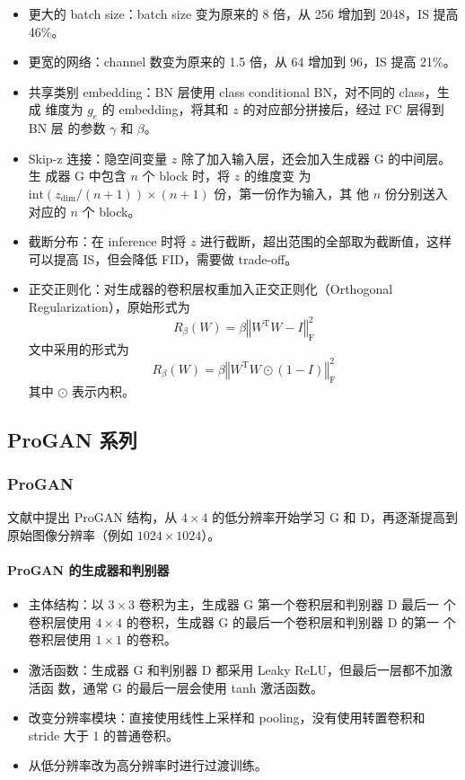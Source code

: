 \begin{itemize}
  \item 更大的 batch size：batch size 变为原来的 8 倍，从 256 增加到 2048，IS 提高 46\%。
  \item 更宽的网络：channel 数变为原来的 1.5 倍，从 64 增加到 96，IS 提高 21\%。
  \item 共享类别 embedding：BN 层使用 class conditional BN，对不同的 class，生成
    维度为 $g_e$ 的 embedding，将其和 $z$ 的对应部分拼接后，经过 FC 层得到 BN 层
    的参数 $\gamma$ 和 $\beta$。
  \item Skip-z 连接：隐空间变量 $z$ 除了加入输入层，还会加入生成器 G 的中间层。生
    成器 G 中包含 $n$ 个 block 时，将 $z$ 的维度变
    为 $\mathrm{int}({z}_{\mathrm{dim}} / (n+1)) \times (n+1)$ 份，第一份作为输入，其
    他 $n$ 份分别送入对应的 $n$ 个 block。
  \item 截断分布：在 inference 时将 $z$ 进行截断，超出范围的全部取为截断值，这样
    可以提高 IS，但会降低 FID，需要做 trade-off。
  \item 正交正则化：对生成器的卷积层权重加入正交正则化（Orthogonal
    Regularization），原始形式为
    \begin{equation}
      R_{\beta}(W) = \beta \left\Vert W^{\mathrm{T}}W-I\right\Vert _{\mathrm{F}}^2
    \end{equation}
    文中采用的形式为
    \begin{equation}
      R_{\beta}(W) = \beta \left\Vert W^{\mathrm{T}}W \odot (1-I)\right\Vert _{\mathrm{F}}^2
    \end{equation}
    其中 $\odot$ 表示内积。
\end{itemize}

\subsection{ProGAN 系列}
\subsubsection{ProGAN}
文献中提出 ProGAN 结构，从 $4 \times 4$ 的低分辨率开始学习 G
和 D，再逐渐提高到原始图像分辨率（例如 $1024 \times 1024$）。

\paragraph{ProGAN 的生成器和判别器}
\begin{itemize}
  \item 主体结构：以 $3 \times 3$ 卷积为主，生成器 G 第一个卷积层和判别器 D 最后一
    个卷积层使用 $4 \times 4$ 的卷积，生成器 G 的最后一个卷积层和判别器 D 的第一
    个卷积层使用 $1 \times 1$ 的卷积。
  \item 激活函数：生成器 G 和判别器 D 都采用 Leaky ReLU，但最后一层都不加激活函
    数，通常 G 的最后一层会使用 tanh 激活函数。
  \item 改变分辨率模块：直接使用线性上采样和 pooling，没有使用转置卷积和 stride
    大于 1 的普通卷积。
  \item 从低分辨率改为高分辨率时进行过渡训练。
\end{itemize}


